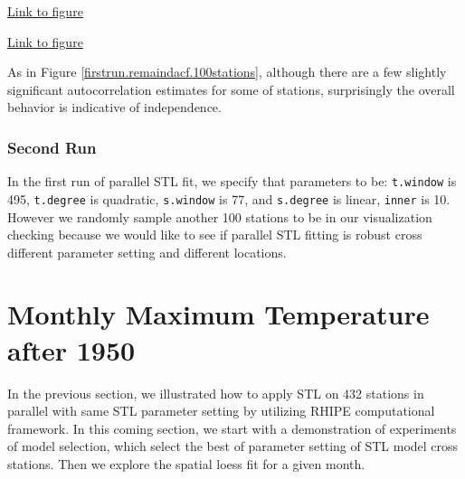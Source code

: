 \begin{framed}
\begin{center}
  \href{../plots/100stations/first_run/QQ.remainder.100stations.tmax.pdf}
  {Link to figure}
  \label{firstrun.QQremaind.100stations}
\end{center}
\end{framed}

\begin{framed}
\begin{center}
  \href{../plots/100stations/first_run/remainder.acf.100stations.tmax.pdf}
  {Link to figure}
  \label{firstrun.remaindacf.100stations}
\end{center}
\end{framed}

As in Figure 
\href{../plots/100stations/first_run/remainder.acf.100stations.tmax.pdf}
{\ref*{firstrun.remaindacf.100stations}},
although there are a few slightly significant autocorrelation estimates for some
of stations, surprisingly the overall behavior is indicative of independence.


\subsubsection{Second Run}

In the first run of parallel STL fit, we specify that parameters to be: 
\texttt{t.window} is 495, \texttt{t.degree} is quadratic, \texttt{s.window} is 
77, and \texttt{s.degree} is linear, \texttt{inner} is 10. However we randomly 
sample another 100 stations to be in our visualization checking because we would 
like to see if parallel STL fitting is robust cross different parameter setting 
and different locations.


\section{Monthly Maximum Temperature after 1950}

In the previous section, we illustrated how to apply STL on 432 stations in parallel
with same STL parameter setting by utilizing RHIPE computational framework. In 
this coming section, we start with a demonstration of experiments of model selection,
which select the best of parameter setting of STL model cross stations. Then we
explore the spatial loess fit for a given month. 

